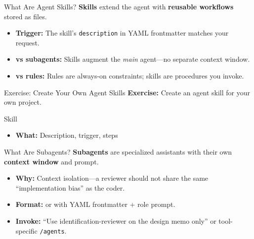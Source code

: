 \begin{frame}{What Are Agent Skills?}
  \textbf{Skills} extend the agent with \textbf{reusable workflows} stored as  files.
  \begin{itemize}
    \item \textbf{Trigger:} \textnormal{The skill's \texttt{description} in YAML frontmatter matches your request.}
    \item \textbf{vs subagents:} \textnormal{Skills augment the \emph{main} agent---no separate context window.}
    \item \textbf{vs rules:} \textnormal{Rules are always-on constraints; skills are procedures you invoke.}
  \end{itemize}
  
\end{frame}

\begin{frame}{Exercise: Create Your Own Agent Skills}
  \textbf{Exercise:} Create an agent skill for your own project.
  \vspace{1em}
  \begin{block}{Skill}
    \begin{itemize}
      \item \textbf{What:} \textnormal{Description, trigger, steps}
    \end{itemize}
  \end{block}
\end{frame}

\begin{frame}{What Are Subagents?}
  \textbf{Subagents} are specialized assistants with their own \textbf{context window} and prompt.
  \begin{itemize}
    \item \textbf{Why:} \textnormal{Context isolation---a reviewer should not share the same ``implementation bias'' as the coder.}
    \item \textbf{Format:} \textnormal{ or  with YAML frontmatter + role prompt.}
    \item \textbf{Invoke:} \textnormal{``Use identification-reviewer on the design memo only'' or tool-specific \texttt{/agents}.}
  \end{itemize}
  \vspace{0.35em}
  
\end{frame}


